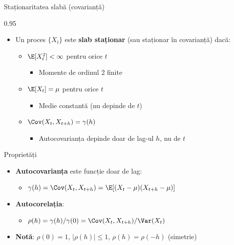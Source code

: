 \documentclass[9pt, aspectratio=169, t]{beamer}
\begin{document}
\begin{frame}{Staționaritatea slabă (covarianță)}
    \begin{cminipage}{0.95\textwidth}
        \small
        \begin{defn}
            \begin{itemize}\setlength{\itemsep}{0pt}
                \item Un proces $\{X_t\}$ este \textbf{slab staționar} (sau staționar în covarianță) dacă:
                \begin{itemize}\setlength{\itemsep}{0pt}
                    \item $\E[X_t^2] < \infty$ pentru orice $t$
                    \begin{itemize}
                        \item Momente de ordinul 2 finite
                    \end{itemize}
                    \item $\E[X_t] = \mu$ pentru orice $t$
                    \begin{itemize}
                        \item Medie constantă (nu depinde de $t$)
                    \end{itemize}
                    \item $\Cov(X_t, X_{t+h}) = \gamma(h)$
                    \begin{itemize}
                        \item Autocovarianța depinde doar de lag-ul $h$, nu de $t$
                    \end{itemize}
                \end{itemize}
            \end{itemize}
        \end{defn}
        \vspace{-2mm}
        \begin{block}{Proprietăți}
            \begin{itemize}\setlength{\itemsep}{0pt}
                \item \textbf{Autocovarianța} este funcție doar de lag:
                \begin{itemize}
                    \item $\gamma(h) = \Cov(X_t, X_{t+h}) = \E[(X_t - \mu)(X_{t+h} - \mu)]$
                \end{itemize}
                \item \textbf{Autocorelația}:
                \begin{itemize}
                    \item $\rho(h) = \gamma(h)/\gamma(0) = \Cov(X_t, X_{t+h})/\Var(X_t)$
                \end{itemize}
                \item \textbf{Notă}: $\rho(0) = 1$, $|\rho(h)| \leq 1$, $\rho(h) = \rho(-h)$ (simetrie)
            \end{itemize}
        \end{block}
    \end{cminipage}
\end{frame}
\end{document}
